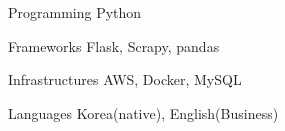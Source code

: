 

\begin{cvskills}

  \cvskill
    {Programming} %
    {Python} %

  \cvskill
    {Frameworks} %
    {Flask, Scrapy, pandas} %

  \cvskill
    {Infrastructures} %
    {AWS, Docker, MySQL} %

  \cvskill
    {Languages} %
    {Korea(native), English(Business)} %

\end{cvskills}
